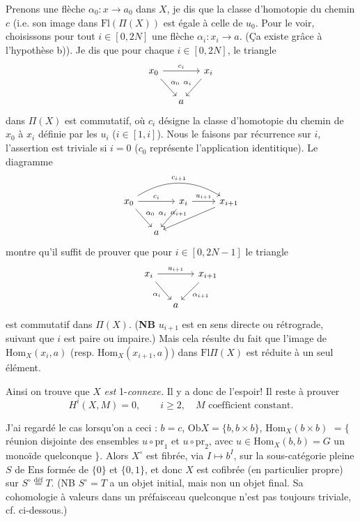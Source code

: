 \documentclass[11pt]{article}
\newcommand{\printedpage}[1]{\marginpar{\footnotesize p.~#1}}
\newcommand{\msp}[1]{\marginpar{\footnotesize [#1]}}
\newcommand{\Hom}{\mathrm{Hom}}
\newcommand{\Fl}{\mathrm{Fl}}
\newcommand{\Ob}{\mathrm{Ob}}
\newcommand{\Ens}{\mathrm{Ens}}
\newcommand{\pr}{\mathrm{pr}}
\newcommand{\deq}{\mathrel{\overset{\text{déf}}{=}}}
\begin{document}
Prenons une flèche $\alpha_0 : x\longrightarrow a_0$ dans $X$, je dis que la %
\msp{page 2}
classe d'homotopie du chemin $c$ (i.e. son image dans $\Fl(\Pi(X))$ est égale à celle de $u_0$. %
Pour le voir, choisissons pour tout $i\in[0,2N]$ une flèche $\alpha_i : x_i\longrightarrow a$. (Ça existe grâce à l'hypothèse b)). Je dis que pour chaque $i\in[0,2N]$, le triangle
\printedpage{2}
\[
\begin{tikzcd}[column sep=small]
x_0 \arrow[rr, "c_i"] \arrow[dr, "\alpha_0"] & & x_i \arrow[dl, "\alpha_i"'] \\
& a &
\end{tikzcd}
\]
dans $\Pi(X)$ est commutatif, où $c_i$ désigne la classe d'homotopie du chemin de $x_0$ à $x_i$ définie par les $u_i$ ($i\in[1,i]$). Nous le faisons par récurrence sur $i$, l'assertion est triviale si $i = 0$ ($c_0$ représente l'application identitique). Le diagramme %
\[
\begin{tikzcd}[column sep=small]
x_0 \arrow[rr, "c_i"] \arrow[dr, "\alpha_0"] \arrow[rrrr, bend left=32, "c_{i+1}"] & & x_i \arrow[dl, "\alpha_i"'] \arrow[rr, "u_{i+1}"] & & x_{i+1} \arrow[dlll, "\alpha_{i+1}"'] \\ %
& a & & &
\end{tikzcd}
\]
montre qu'il suffit de prouver que pour $i\in[0,2N-1]$ le triangle
\[
\begin{tikzcd}[column sep=small]
x_i \arrow[rr, "u_{i+1}"] \arrow[dr, "\alpha_i"'] & & x_{i+1} \arrow[dl, "\alpha_{i+1}"] \\
& a &
\end{tikzcd}
\]
est commutatif dans $\Pi(X)$. (\textbf{NB} $u_{i+1}$ est en sens directe ou rétrograde, suivant que %
$i$ est paire ou impaire.) Mais cela résulte du fait que l'image de $\Hom_X(x_i,a)$ (resp. $\Hom_X(x_{i+1},a)$) %
\msp{page 3}
dans $\Fl\Pi(X)$ est réduite à un seul élément.

Ainsi on trouve que $X$ \textit{est} 1-\textit{connexe.} Il y a donc de l'espoir! Il reste à prouver
\[
H^i(X,M) = 0, \qquad i\geq 2, \quad M \text{ coefficient constant.}
\]

J'ai regardé le cas lorsqu'on a ceci : $b = c$, $\Ob X = \{b, b\times b\}$, $\Hom_X(b\times b)$ $= \{$ réunion disjointe des ensembles $u\circ\pr_1$ et $u\circ\pr_2$, avec $u\in\Hom_X(b,b) = G$ un monoïde quelconque $\}$. Alors $X^\circ$ est fibrée, via $I\longmapsto b^I$, sur la sous-catégorie pleine $S$ de $\Ens$ formée de $\{0\}$ et $\{0,1\}$, et donc $X$ est cofibrée (en particulier propre) sur $S^\circ \deq T$. (NB $S^\circ = T$ a un objet initial, mais non un objet final. Sa cohomologie à valeurs dans un préfaisceau quelconque n'est pas toujours triviale, cf. ci-dessous.)
\end{document}
